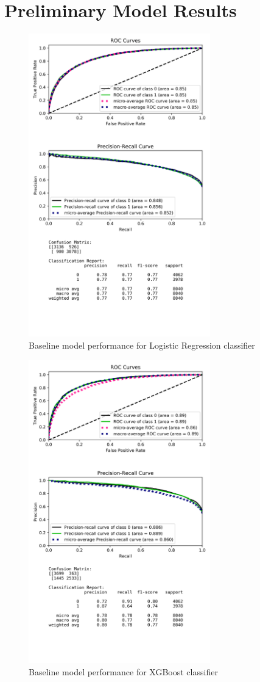 \documentclass[journal,twoside,web]{ieeecolor}
\begin{document}
\section{Preliminary Model Results}
\begin{figure}[h!]
  \centering
  \includegraphics[width=3.1in]{project/code/preliminary-logregression-downsampled_f1score.png}
  \caption{Baseline model performance for Logistic Regression classifier}
  \label{fig:prelim-logreg}
\end{figure}

\begin{figure}[h!]
  \centering
  \includegraphics[width=3.1in]{project/code/preliminary-xgboost-downsampled.png}
  \caption{Baseline model performance for XGBoost classifier}
  \label{fig:prelim-xgboost}
\end{figure}
\end{document}
